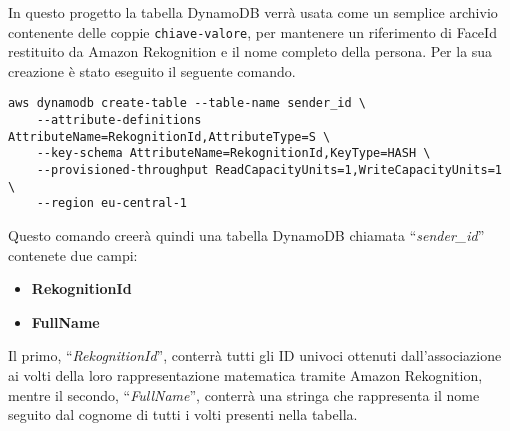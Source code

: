 In questo progetto la tabella DynamoDB verrà usata come un semplice archivio contenente delle coppie \texttt{chiave-valore},
per mantenere un riferimento di FaceId restituito da Amazon Rekognition e il nome completo della persona. Per la sua creazione è stato eseguito il 
seguente comando.
\begin{lstlisting}[frame=lines]
    aws dynamodb create-table --table-name sender_id \
    --attribute-definitions AttributeName=RekognitionId,AttributeType=S \
    --key-schema AttributeName=RekognitionId,KeyType=HASH \
    --provisioned-throughput ReadCapacityUnits=1,WriteCapacityUnits=1 \
    --region eu-central-1
\end{lstlisting}
Questo comando creerà quindi una tabella DynamoDB chiamata ``\textsl{sender\_id}'' contenete due campi:
\begin{itemize}
    \item \textbf{RekognitionId}
    \item \textbf{FullName}
\end{itemize}
Il primo, ``\textsl{RekognitionId}'', conterrà tutti gli ID univoci ottenuti dall'associazione ai volti della loro rappresentazione matematica tramite Amazon Rekognition, 
mentre il secondo, ``\textsl{FullName}'', conterrà una stringa che rappresenta il nome seguito dal cognome di tutti i volti presenti nella tabella.

